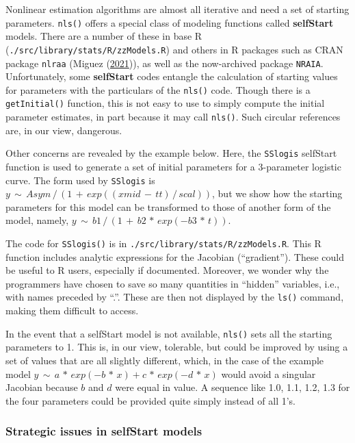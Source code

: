 \documentclass[
]{article}
\begin{document}
Nonlinear estimation algorithms are almost all iterative and need a set
of starting parameters. \texttt{nls()} offers a special class of
modeling functions called \textbf{selfStart} models. There are a number
of these in base R (\texttt{./src/library/stats/R/zzModels.R}) and
others in R packages such as CRAN package \texttt{nlraa} (Miguez
(\protect\hyperlink{ref-MiguezNLRAA2021}{2021})), as well as the
now-archived package \texttt{NRAIA}. Unfortunately, some
\textbf{selfStart} codes entangle the calculation of starting values for
parameters with the particulars of the \texttt{nls()} code. Though there
is a \texttt{getInitial()} function, this is not easy to use to simply
compute the initial parameter estimates, in part because it may call
\texttt{nls()}. Such circular references are, in our view, dangerous.

Other concerns are revealed by the example below. Here, the
\texttt{SSlogis} selfStart function is used to generate a set of initial
parameters for a 3-parameter logistic curve. The form used by
\texttt{SSlogis} is
\(y \,\sim\, Asym\,/\, (1 \,+\, exp((xmid\,-\,tt)\,/\,scal))\), but we
show how the starting parameters for this model can be transformed to
those of another form of the model, namely,
\(y \,\sim\, b1\,/\,(1 \,+\, b2\,*\,exp(-b3\,*\,t))\).

The code for \texttt{SSlogis()} is in
\texttt{./src/library/stats/R/zzModels.R}. This R function includes
analytic expressions for the Jacobian (``gradient''). These could be
useful to R users, especially if documented. Moreover, we wonder why the
programmers have chosen to save so many quantities in ``hidden''
variables, i.e., with names preceded by ``.''. These are then not
displayed by the \texttt{ls()} command, making them difficult to access.

In the event that a selfStart model is not available, \texttt{nls()}
sets all the starting parameters to 1. This is, in our view, tolerable,
but could be improved by using a set of values that are all slightly
different, which, in the case of the example model
\(y \,\sim\, a \,*\, exp(-b \,*\, x) + c\,*\,exp(-d \,*\, x)\) would
avoid a singular Jacobian because \(b\) and \(d\) were equal in value. A
sequence like 1.0, 1.1, 1.2, 1.3 for the four parameters could be
provided quite simply instead of all 1's.

\hypertarget{strategic-issues-in-selfstart-models}{%
\subsubsection{Strategic issues in selfStart
models}\label{strategic-issues-in-selfstart-models}}
\end{document}
